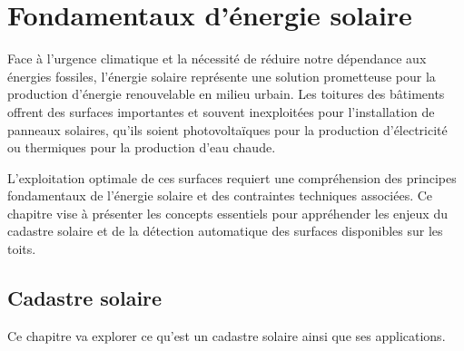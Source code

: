 \chapter{Fondamentaux d'énergie solaire}
\label{chap:fondamentaux_energie}

\par{Face à l'urgence climatique et la nécessité de réduire notre dépendance aux énergies fossiles, l'énergie solaire représente une solution prometteuse pour la production d'énergie renouvelable en milieu urbain. Les toitures des bâtiments offrent des surfaces importantes et souvent inexploitées pour l'installation de panneaux solaires, qu'ils soient photovoltaïques pour la production d'électricité ou thermiques pour la production d'eau chaude.}

\par{L'exploitation optimale de ces surfaces requiert une compréhension des principes fondamentaux de l'énergie solaire et des contraintes techniques associées. Ce chapitre vise à présenter les concepts essentiels pour appréhender les enjeux du cadastre solaire et de la détection automatique des surfaces disponibles sur les toits.}

\localtableofcontents

\newpage



\section{Cadastre solaire}
\par{Ce chapitre va explorer ce qu'est un cadastre solaire ainsi que ses applications.}

